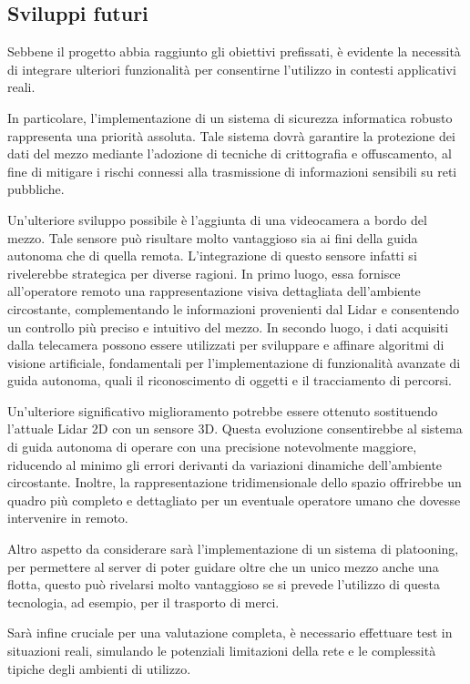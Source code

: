 \subsection{Sviluppi futuri}
Sebbene il progetto abbia raggiunto gli obiettivi prefissati, è evidente la necessità di integrare ulteriori funzionalità per consentirne l'utilizzo in contesti applicativi reali. 

\noindent In particolare, l'implementazione di un sistema di sicurezza informatica robusto rappresenta una priorità assoluta. Tale sistema dovrà garantire la protezione dei dati del mezzo mediante l'adozione di tecniche di crittografia e offuscamento, al fine di mitigare i rischi connessi alla trasmissione di informazioni sensibili su reti pubbliche.

\noindent Un'ulteriore sviluppo possibile è l'aggiunta di una videocamera a bordo del mezzo. Tale sensore può risultare molto vantaggioso sia ai fini della guida autonoma che di quella remota. L'integrazione di questo sensore infatti si rivelerebbe strategica per diverse ragioni. In primo luogo, essa fornisce all'operatore remoto una rappresentazione visiva dettagliata dell'ambiente circostante, complementando le informazioni provenienti dal Lidar e consentendo un controllo più preciso e intuitivo del mezzo. In secondo luogo, i dati acquisiti dalla telecamera possono essere utilizzati per sviluppare e affinare algoritmi di visione artificiale, fondamentali per l'implementazione di funzionalità avanzate di guida autonoma, quali il riconoscimento di oggetti e il tracciamento di percorsi. 

\noindent Un'ulteriore significativo miglioramento potrebbe essere ottenuto sostituendo l'attuale Lidar 2D con un sensore 3D. Questa evoluzione consentirebbe al sistema di guida autonoma di operare con una precisione notevolmente maggiore, riducendo al minimo gli errori derivanti da variazioni dinamiche dell'ambiente circostante. Inoltre, la rappresentazione tridimensionale dello spazio offrirebbe un quadro più completo e dettagliato per un eventuale operatore umano che dovesse intervenire in remoto.

\noindent Altro aspetto da considerare sarà l'implementazione di un sistema di platooning, per permettere al  server di poter guidare oltre che un unico mezzo anche una flotta, questo può rivelarsi molto vantaggioso se si prevede l'utilizzo di questa tecnologia, ad esempio, per il trasporto di merci.

\noindent Sarà infine cruciale per una valutazione completa, è necessario effettuare test in situazioni reali, simulando le potenziali limitazioni della rete e le complessità tipiche degli ambienti di utilizzo.

